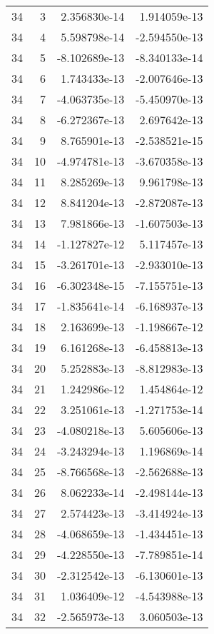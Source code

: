 \begin{tabular}{rrrr}
  34 &    3 &  2.356830e-14 &  1.914059e-13 \\
  34 &    4 &  5.598798e-14 & -2.594550e-13 \\
  34 &    5 & -8.102689e-13 & -8.340133e-14 \\
  34 &    6 &  1.743433e-13 & -2.007646e-13 \\
  34 &    7 & -4.063735e-13 & -5.450970e-13 \\
  34 &    8 & -6.272367e-13 &  2.697642e-13 \\
  34 &    9 &  8.765901e-13 & -2.538521e-15 \\
  34 &   10 & -4.974781e-13 & -3.670358e-13 \\
  34 &   11 &  8.285269e-13 &  9.961798e-13 \\
  34 &   12 &  8.841204e-13 & -2.872087e-13 \\
  34 &   13 &  7.981866e-13 & -1.607503e-13 \\
  34 &   14 & -1.127827e-12 &  5.117457e-13 \\
  34 &   15 & -3.261701e-13 & -2.933010e-13 \\
  34 &   16 & -6.302348e-15 & -7.155751e-13 \\
  34 &   17 & -1.835641e-14 & -6.168937e-13 \\
  34 &   18 &  2.163699e-13 & -1.198667e-12 \\
  34 &   19 &  6.161268e-13 & -6.458813e-13 \\
  34 &   20 &  5.252883e-13 & -8.812983e-13 \\
  34 &   21 &  1.242986e-12 &  1.454864e-12 \\
  34 &   22 &  3.251061e-13 & -1.271753e-14 \\
  34 &   23 & -4.080218e-13 &  5.605606e-13 \\
  34 &   24 & -3.243294e-13 &  1.196869e-14 \\
  34 &   25 & -8.766568e-13 & -2.562688e-13 \\
  34 &   26 &  8.062233e-14 & -2.498144e-13 \\
  34 &   27 &  2.574423e-13 & -3.414924e-13 \\
  34 &   28 & -4.068659e-13 & -1.434451e-13 \\
  34 &   29 & -4.228550e-13 & -7.789851e-14 \\
  34 &   30 & -2.312542e-13 & -6.130601e-13 \\
  34 &   31 &  1.036409e-12 & -4.543988e-13 \\
  34 &   32 & -2.565973e-13 &  3.060503e-13 \\

\end{tabular}
